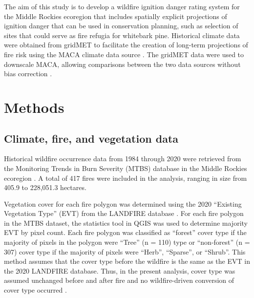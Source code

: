 \documentclass[11p]{article}
\begin{document}
The aim of this study is to develop a wildfire ignition danger rating system for the Middle Rockies ecoregion that includes spatially explicit projections of ignition danger that can be used in conservation planning, such as selection of sites that could serve as fire refugia for whitebark pine. Historical climate data were obtained from gridMET to facilitate the creation of long-term projections of fire risk using the MACA climate data source \citep{abatzoglouComparisonStatisticalDownscaling2012}.  The gridMET data were used to downscale MACA, allowing comparisons between the two data sources without bias correction \citep{tercekRobustProjectionsConsequences2023}.



\section{Methods}

\subsection{Climate, fire, and vegetation data}

Historical wildfire occurrence data from 1984 through 2020 were retrieved from the Monitoring Trends in Burn Severity (MTBS) database \citep{eidenshinkProjectMonitoringTrends2007} in the Middle Rockies ecoregion \citep{omernikEcoregionsConterminousUnited1987}.  A total of 417 fires were included in the analysis, ranging in size from 405.9 to 228,051.3 hectares.

Vegetation cover for each fire polygon was determined using the 2020 ``Existing Vegetation Type'' (EVT) from the LANDFIRE database \citep{rollinsLANDFIRENationallyConsistent2009}.  For each fire polygon in the MTBS dataset, the statistics tool in QGIS was used to determine majority EVT by pixel count.  Each fire polygon was classified as ``forest'' cover type if the majority of pixels in the polygon were ``Tree'' (n = 110) type or ``non-forest'' (n = 307) cover type if the majority of pixels were ``Herb'', ``Sparse'', or ``Shrub''. This method assumes that the cover type before the wildfire is the same as the EVT in the 2020 LANDFIRE database. Thus, in the present analysis, cover type was assumed unchanged before and after fire and no wildfire-driven conversion of cover type occurred \citep{coopWildfireDrivenForestConversion2020}.
\end{document}
